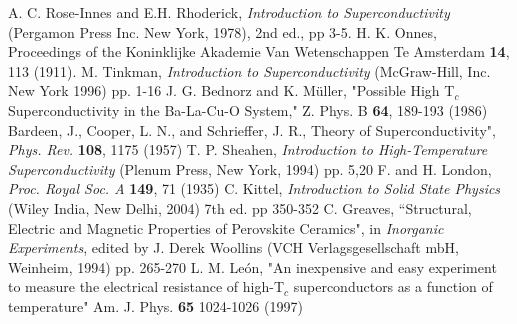\documentclass[aps,prl,twocolumn,groupedaddress]{revtex4}
\begin{document}
%
\begin{thebibliography}{9}
A. C. Rose-Innes and E.H. Rhoderick, \emph{Introduction to Superconductivity} (Pergamon Press Inc. New York, 1978), 2nd ed., pp 3-5.
H. K. Onnes, Proceedings of the Koninklijke Akademie Van Wetenschappen Te Amsterdam \textbf{14}, 113 (1911).
 M. Tinkman, \emph{Introduction to Superconductivity} (McGraw-Hill, Inc. New York 1996) pp. 1-16
 J. G. Bednorz and K. M\"{u}ller, "Possible High T$_{c}$ Superconductivity in the Ba-La-Cu-O System," Z. Phys. B \textbf{64}, 189-193 (1986)
Bardeen, J., Cooper, L. N., and Schrieffer, J. R., 
Theory of Superconductivity", \emph{Phys. Rev.} \textbf{108}, 1175 (1957)
T. P. Sheahen, \emph{Introduction to High-Temperature Superconductivity} (Plenum Press, New York, 1994) pp. 5,20
F. and H. London, \emph{Proc. Royal Soc. A} \textbf{149}, 71 (1935)
C. Kittel, \emph{Introduction to Solid State Physics} (Wiley India, New Delhi, 2004) 7th ed. pp 350-352
C. Greaves, ``Structural, Electric and Magnetic Properties of Perovskite Ceramics", in \emph{Inorganic Experiments}, edited by J. Derek Woollins (VCH Verlagsgesellschaft mbH, Weinheim, 1994) pp. 265-270
L. M. Le\'{o}n, "An inexpensive and easy experiment to measure the electrical resistance
of high-T$_{c}$ superconductors as a function of temperature" Am. J. Phys. \textbf{65} 1024-1026 (1997)


\end{thebibliography}
\end{document}
